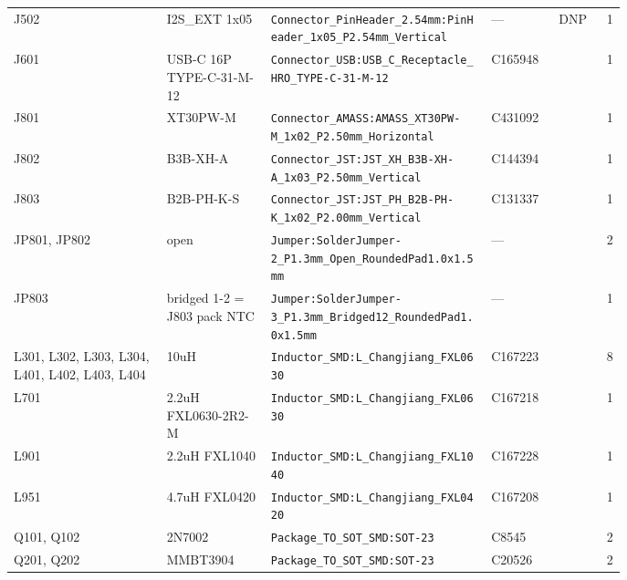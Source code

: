 {\begin{longtable}{@{}>{\raggedright\arraybackslash}p{0.25\linewidth}>{\raggedright\arraybackslash}p{0.17\linewidth}>{\raggedright\arraybackslash}p{0.36\linewidth}l l r@{}}
J502 & I2S\_EXT 1x05 & \texttt{Connector\_\allowbreak{}PinHeader\_\allowbreak{}2.54mm:\allowbreak{}PinHeader\_\allowbreak{}1x05\_\allowbreak{}P2.54mm\_\allowbreak{}Vertical} & --- & DNP & 1\\
J601 & USB-C 16P TYPE-C-31-M-12 & \texttt{Connector\_\allowbreak{}USB:\allowbreak{}USB\_\allowbreak{}C\_\allowbreak{}Receptacle\_\allowbreak{}HRO\_\allowbreak{}TYPE-C-31-M-12} & C165948 &  & 1\\
J801 & XT30PW-M & \texttt{Connector\_\allowbreak{}AMASS:\allowbreak{}AMASS\_\allowbreak{}XT30PW-M\_\allowbreak{}1x02\_\allowbreak{}P2.50mm\_\allowbreak{}Horizontal} & C431092 &  & 1\\
J802 & B3B-XH-A & \texttt{Connector\_\allowbreak{}JST:\allowbreak{}JST\_\allowbreak{}XH\_\allowbreak{}B3B-XH-A\_\allowbreak{}1x03\_\allowbreak{}P2.50mm\_\allowbreak{}Vertical} & C144394 &  & 1\\
J803 & B2B-PH-K-S & \texttt{Connector\_\allowbreak{}JST:\allowbreak{}JST\_\allowbreak{}PH\_\allowbreak{}B2B-PH-K\_\allowbreak{}1x02\_\allowbreak{}P2.00mm\_\allowbreak{}Vertical} & C131337 &  & 1\\
JP801, JP802 & open & \texttt{Jumper:\allowbreak{}SolderJumper-2\_\allowbreak{}P1.3mm\_\allowbreak{}Open\_\allowbreak{}RoundedPad1.0x1.5mm} & --- &  & 2\\
JP803 & bridged 1-2 = J803 pack NTC & \texttt{Jumper:\allowbreak{}SolderJumper-3\_\allowbreak{}P1.3mm\_\allowbreak{}Bridged12\_\allowbreak{}RoundedPad1.0x1.5mm} & --- &  & 1\\
L301, L302, L303, L304, L401, L402, L403, L404 & 10uH & \texttt{Inductor\_\allowbreak{}SMD:\allowbreak{}L\_\allowbreak{}Changjiang\_\allowbreak{}FXL0630} & C167223 &  & 8\\
L701 & 2.2uH FXL0630-2R2-M & \texttt{Inductor\_\allowbreak{}SMD:\allowbreak{}L\_\allowbreak{}Changjiang\_\allowbreak{}FXL0630} & C167218 &  & 1\\
L901 & 2.2uH FXL1040 & \texttt{Inductor\_\allowbreak{}SMD:\allowbreak{}L\_\allowbreak{}Changjiang\_\allowbreak{}FXL1040} & C167228 &  & 1\\
L951 & 4.7uH FXL0420 & \texttt{Inductor\_\allowbreak{}SMD:\allowbreak{}L\_\allowbreak{}Changjiang\_\allowbreak{}FXL0420} & C167208 &  & 1\\
Q101, Q102 & 2N7002 & \texttt{Package\_\allowbreak{}TO\_\allowbreak{}SOT\_\allowbreak{}SMD:\allowbreak{}SOT-23} & C8545 &  & 2\\
Q201, Q202 & MMBT3904 & \texttt{Package\_\allowbreak{}TO\_\allowbreak{}SOT\_\allowbreak{}SMD:\allowbreak{}SOT-23} & C20526 &  & 2\\

\end{longtable}}
